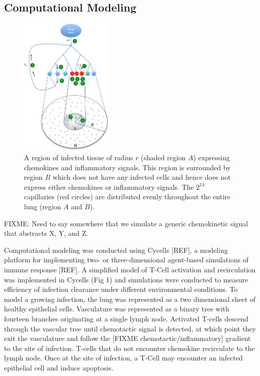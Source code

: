 \documentclass[10pt]{article}
\begin{document}
\subsection*{Computational Modeling}

\begin{figure}[ht!]
\begin{center}
\includegraphics[width=0.4\textwidth]{SystemChart}
\end{center}
\caption{A region of infected tissue of radius $r$ (shaded region $A$) expressing chemokines and inflammatory signals. This region is surrounded by region $B$ which does not have any infected cells and hence does not express either chemokines or inflammatory signals. The $2^{14}$ capillaries (red circles) are distributed evenly throughout the entire lung (region $A$ and $B$).}
\label{fig:systemchart}
\end{figure}


FIXME: Need to say somewhere that we simulate a generic chemokinetic signal that abstracts X, Y, and Z.

Computational modeling was conducted using Cycells [REF], a modeling platform for implementing two- or three-dimensional agent-based simulations of immune response [REF]. A simplified model of T-Cell activation and recirculation was implemented in Cycells (Fig 1) and simulations were conducted to measure efficiency of infection clearance under different environmental conditions. To model a growing infection, the lung was represented as a two dimensional sheet of healthy epithelial cells. Vasculature was represented as a binary tree with fourteen branches originating at a single lymph node. Activated T-cells descend through the vascular tree until chemotactic signal is detected, at which point they exit the vasculature and follow the [FIXME chemotactic/inflammatory] gradient to the site of infection. T-cells that do not encounter chemokine recirculate to the lymph node. Once at the site of infection, a T-Cell may encounter an infected epithelial cell and induce apoptosis.
\end{document}
